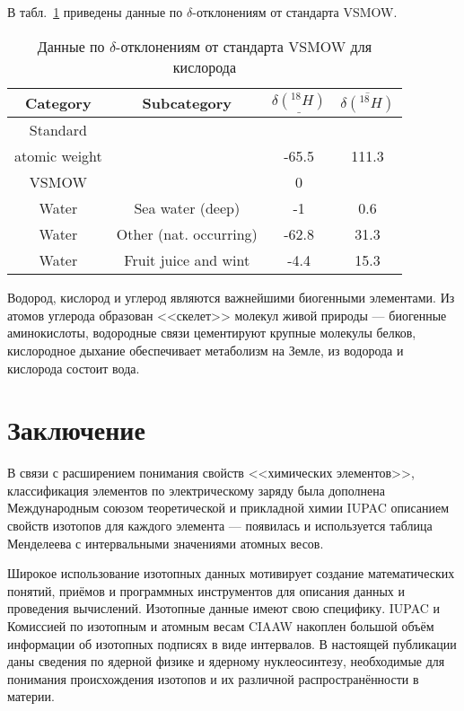 \documentclass[a5paper,openany]{book}
\newcommand{\ov}{\overline}
\newcommand{\un}{\underline}
\begin{document}
В табл.~\ref{t:IsotopeDeltaO} приведены данные по $\delta$-отклонениям от стандарта VSMOW.	

\begin{table}[h]
	\centering
	{\footnotesize        
		\begin{tabular}{|c|c|c|c|}
			\hline
			Category &	Subcategory  & $\un{\delta(^{18}H)}$	&  $\ov{\delta(^{18}H)}$\\
			\hline
			Standard  & ~& ~ & ~   \\
			atomic weight & ~ & -65.5 & 111.3  \\
			\hline
			VSMOW & ~ &  0 & ~  \\
			\hline
			Water & Sea water (deep)&   -1 & 0.6 \\
			Water  & Other (nat. occurring) &  -62.8 & 31.3 \\
			Water  & Fruit juice and wint  & -4.4 & 15.3\\ 
			\hline
		\end{tabular}
	}
	\caption{Данные по $\delta$-отклонениям от стандарта VSMOW для кислорода}
	\label{t:IsotopeDeltaO}
\end{table}

Водород, кислород и углерод являются важнейшими биогенными элементами.	Из атомов углерода образован <<скелет>> молекул живой природы --- биогенные аминокислоты, водородные связи цементируют крупные молекулы белков,  кислородное дыхание обеспечивает метаболизм на Земле, из водорода и кислорода состоит вода. 


\chapter*{Заключение}

В связи с расширением понимания свойств <<химических элементов>>, классификация элементов по электрическому заряду была дополнена Международным союзом теоретической и прикладной химии IUPAC описанием свойств изотопов для каждого элемента --- появилась и используется таблица Менделеева с интервальными значениями атомных весов.

Широкое использование изотопных данных мотивирует создание математических понятий, приёмов и программных инструментов для описания данных и проведения вычислений. 
Изотопные данные имеют свою специфику. IUPAC и Комиссией по изотопным и атомным весам CIAAW накоплен большой объём информации об изотопных подписях в виде интервалов.
В настоящей публикации даны сведения по ядерной физике и ядерному  нуклеосинтезу, необходимые для понимания происхождения изотопов и их различной распространённости в материи.
\end{document}
